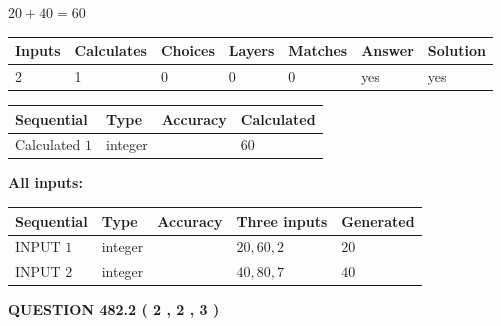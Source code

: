 \documentclass[12pt]{article}
\begin{document}
 

$ %
20 +  %
40=   %
60$
 
 
\noindent{}
 
 

 
   
   
   
   
\noindent\begin{tabular}{|l|l|l|l|l|l|l|}
 \hline
Inputs & Calculates & Choices & Layers & Matches & Answer & Solution \\ \hline
 2  & 
 1  & 
 0
  & 
 0  & 
 0  & 
  yes & 
  yes 
  \\ \hline
 \end{tabular}
   
   
   
   
\noindent{}
   
   
  
  
\noindent\begin{tabular}{|l|l|l|l|}
\hline
 Sequential & Type & Accuracy & Calculated \\ 
\hline
 
 
  Calculated $  1 $ & integer &  & 
  $ 60 $ 
 \\  \hline  
 \end{tabular}
   
   
   
   
\noindent\vspace{0.1in}\hspace{-0.08in} {\textbf{\Large{All inputs: }}}
   
   
  
  
\noindent\begin{tabular}{|l|l|l|l|l|}
\hline
 Sequential & Type & Accuracy & Three inputs & Generated \\ 
\hline
 
 
  INPUT $  1 $ & integer &  & $
 20
 , 
 60
 , 
 2
 $ & $ 20 $ 
 \\  \hline  
 
 
  INPUT $  2 $ & integer &  & $
 40
 , 
 80
 , 
 7
 $ & $ 40 $ 
 \\  \hline  
 \end{tabular}
   
   
  
\vspace{0.2in}
  
{\textbf{\Large{QUESTION
482.2 
 ( 2 , 2 , 3 )
}}}
  
\end{document}
